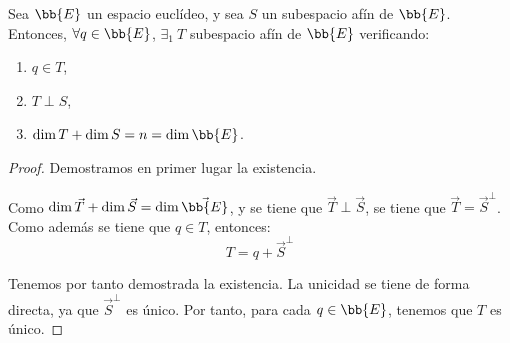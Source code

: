 \begin{teo}
    Sea $\bb{E}$ un espacio euclídeo, y sea $S$ un subespacio afín de $\bb{E}$. Entonces, $\forall q\in \bb{E}$, $\exists_1~ T$ subespacio afín de $\bb{E}$ verificando:
    \begin{enumerate}
        \item $q\in T$,
        \item $T\perp S$,
        \item $\dim T + \dim S = n=\dim \bb{E}$.
    \end{enumerate}
\end{teo}
\begin{proof} Demostramos en primer lugar la existencia. 

    Como $\dim \vec{T} + \dim \vec{S} = \dim \vec{\bb{E}}$, y se tiene que $\vec{T}\perp \vec{S}$, se tiene que $\vec{T}=\vec{S}^\perp$. Como además se tiene que $q\in T$, entonces:
    $$T=q+\vec{S}^\perp$$

    Tenemos por tanto demostrada la existencia. La unicidad se tiene de forma directa, ya que $\vec{S}^\perp$ es único. Por tanto, para cada $q\in \bb{E}$, tenemos que $T$ es único.
\end{proof}

